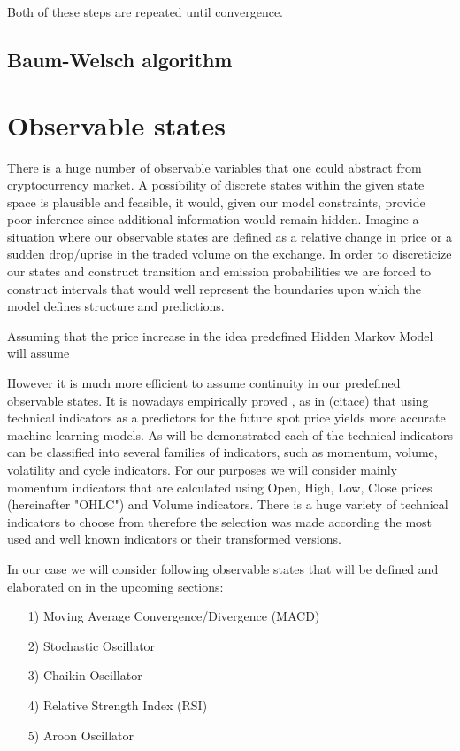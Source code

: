 Both of these steps are repeated until convergence. 

\subsection{Baum-Welsch algorithm}






\section{Observable states}

	There is a huge number of observable variables that one could abstract from cryptocurrency market. A possibility of discrete states within the given state space is plausible and feasible, it would, given our model constraints, provide poor inference since additional information would remain hidden. Imagine a situation where our observable states are defined as a relative change in price or a sudden drop/uprise in the traded volume on the exchange. In order to discreticize our states and construct transition and emission probabilities we are forced to construct intervals that would well represent the boundaries upon which the model defines structure and predictions. 
	
Assuming that the price increase in   the idea predefined Hidden Markov Model will assume
	
	However it is much more efficient to assume continuity in our predefined observable states. It is nowadays empirically proved , as in (citace) that using technical indicators as a predictors for the future spot price yields more accurate machine learning models. As will be demonstrated each of the technical indicators can be classified into several families of indicators, such as momentum, volume, volatility and cycle indicators. For our purposes we will consider mainly momentum indicators that are calculated using Open, High, Low, Close prices (hereinafter "OHLC") and Volume indicators. There is a huge variety of technical indicators to choose from therefore the selection was made according the most used and well known indicators or their transformed versions. 

In our case we will consider following observable states that will be defined and elaborated on in the upcoming sections:

\begin{itemize}
\item[1)] Moving Average Convergence/Divergence (MACD)
\item[2)] Stochastic Oscillator
\item[3)] Chaikin Oscillator 
\item[4)] Relative Strength Index (RSI)
\item[5)] Aroon Oscillator 
\end{itemize}


